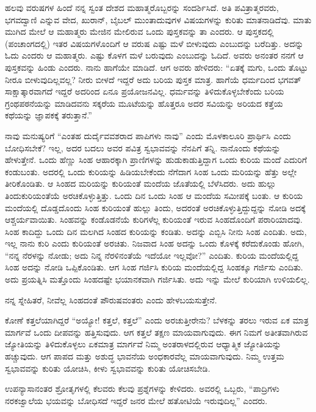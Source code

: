 ಹಲವು ವರುಷಗಳ ಹಿಂದೆ ನನ್ನ ಸ್ವಂತ ದೇಶದ ಮಹಾತ್ಮರೊಬ್ಬರನ್ನು ಸಂದರ್ಶಿಸಿದೆ. ಅತಿ ಪವಿತ್ರಾತ್ಮರವರು, ಭಗವದ್ವಾಣಿ ಎನ್ನುವ ವೇದ, ಖುರಾನ್, ಬೈಬಲ್ ಮುಂತಾದು\-ವುಗಳ ವಿಷಯಗಳನ್ನು ಕುರಿತು ಮಾತನಾಡಿದೆವು. ಮಾತು ಮುಗಿದ ಮೇಲೆ ಆ ಮಹಾತ್ಮರು ಮೇಜಿನ ಮೇಲಿರುವ ಒಂದು ಪುಸ್ತಕವನ್ನು ತಾ ಎಂದರು. ಆ ಪುಸ್ತಕದಲ್ಲಿ (ಪಂಚಾಂಗದಲ್ಲಿ) ಇತರ ವಿಷಯಗಳೊಂದಿಗೆ ಆ ವರುಷ ಎಷ್ಟು ಮಳೆ ಬೀಳುವುದು ಎಂಬುದನ್ನು ಬರೆದಿತ್ತು. ಅದನ್ನು ಓದು ಎಂದರು ಆ ಮಹಾತ್ಮರು. ಎಷ್ಟು ಕೊಳಗ ಮಳೆ ಬರುವುದು ಎಂಬುದನ್ನು ಓದಿದೆ. ಅವರು ಅನಂತರ ನನಗೆ ಆ ಪುಸ್ತಕವನ್ನು ಹಿಂಡು ಎಂದರು. ನಾನು ಹಾಗೆಯೇ ಮಾಡಿದೆ. ಆಗ ಅವರು ಹೇಳಿದರು: “ಏತಕ್ಕೆ ಮಗು, ಒಂದು ತೊಟ್ಟು ನೀರೂ ಬೀಳುವುದಿಲ್ಲವಲ್ಲ? ನೀರು ಬೀಳದೆ ಇದ್ದರೆ ಅದು ಬರಿಯ ಪುಸ್ತಕ ಮಾತ್ರ. ಹಾಗೆಯೆ ಧರ್ಮದಿಂದ ಭಗವತ್ ಸಾಕ್ಷಾತ್ಕಾರವಾಗದೆ ಇದ್ದರೆ ಅದರಿಂದ ಏನೂ ಪ್ರಯೋಜನವಿಲ್ಲ. ಧರ್ಮವನ್ನು ತಿಳಿದುಕೊಳ್ಳಬೇಕೆಂದು ಬರಿಯ ಗ್ರಂಥಪಠನೆಯನ್ನು ಮಾಡಿದವನು ಸಕ್ಕರೆಯ ಮೂಟೆಯನ್ನು ಹೊತ್ತರೂ ಅದರ ಸವಿಯನ್ನು ಅರಿಯದ ಕತ್ತೆಯ ಕಥೆಯನ್ನು ಜ್ಞಾಪಕಕ್ಕೆ ತರುತ್ತಾನೆ.”

ನಾವು ಮನುಷ್ಯರಿಗೆ “ಎಂತಹ ದುರ್ದೈವವಶರಾದ ಪಾಪಿಗಳು ನಾವು'' ಎಂದು ಮೊಳಕಾಲೂರಿ ಪ್ರಾರ್ಥಿಸಿ ಎಂದು ಬೋಧಿಸಬೇಕೆ? ಇಲ್ಲ, ಅದರ ಬದಲು ಅವರ ಪವಿತ್ರ ಸ್ವಭಾವವನ್ನು ನೆನಪಿಗೆ ತನ್ನಿ. ನಾನೊಂದು ಕಥೆಯನ್ನು ಹೇಳುತ್ತೇನೆ. ಒಂದು ಹೆಣ್ಣು ಸಿಂಹ ಆಹಾರಕ್ಕಾಗಿ ಪ್ರಾಣಿಗಳನ್ನು ಹುಡುಕಾಡುತ್ತಿದ್ದಾಗ ಒಂದು ಕುರಿಯ ಮಂದೆ ಎದುರಿಗೆ ಕಂಡುಬಂತು. ಅದರಲ್ಲಿ ಒಂದು ಕುರಿಯನ್ನು ಹಿಡಿಯಬೇಕೆಂದು ನೆಗೆದಾಗ ಸಿಂಹ ಒಂದು ಮರಿಯನ್ನು ಹೆತ್ತು ಅಲ್ಲೇ ತೀರಿಕೊಂಡಿತು. ಆ ಸಿಂಹದ ಮರಿಯನ್ನು ಕುರಿಯಂತೆ ಮಂದೆಯ ಜೊತೆಯಲ್ಲಿ ಬೆಳೆಸಿದರು. ಅದು ಹುಲ್ಲು ತಿಂದು\break ಕುರಿಯಂತೆಯೆ ಅರಚಿಕೊಳ್ಳುತ್ತಿತ್ತು. ಒಂದು ದಿನ ಒಂದು ಸಿಂಹ ಆ ಮಂದೆಯ ಸಮೀಪಕ್ಕೆ ಬಂತು. ಆ ಕುರಿಯ ಮಂದೆಯಲ್ಲಿ ದೊಡ್ಡದೊಂದು ಸಿಂಹ ಕುರಿಯಂತೆ ಹುಲ್ಲು ತಿಂದು, ಅದರಂತೆ ಅರಚಿಕೊಳ್ಳುತ್ತಿದ್ದುದ್ದನ್ನು ನೋಡಿ ಅದಕ್ಕೆ ಆಶ್ಚರ್ಯವಾಯಿತು. ಸಿಂಹವನ್ನು ಕಂಡೊಡನೆಯೆ ಕುರಿಗಳೆಲ್ಲ ಕುರಿಯಂತೆ ಇರುವ ಸಿಂಹದೊಂದಿಗೆ ಪರಾರಿಯಾದವು. ಸಿಂಹ ಕಾದಿದ್ದು ಒಂದು ದಿನ ಮಲಗಿದ ಸಿಂಹದ ಕುರಿಯನ್ನು ಕಂಡಿತು. ಅದನ್ನು ಎಬ್ಬಿಸಿ ನೀನು ಸಿಂಹ ಎಂದಿತು. ಅದು, ಇಲ್ಲ ನಾನು ಕುರಿ ಎಂದು ಕುರಿಯಂತೆ ಅರಚಿತು. ನಿಜವಾದ ಸಿಂಹ ಅದನ್ನು ಒಂದು ಕೊಳಕ್ಕೆ ಕರೆದುಕೊಂಡು ಹೋಗಿ, “ನನ್ನ ನೆರಳನ್ನು ನೋಡು; ಅದು ನಿನ್ನ ನೆರಳಿನಂತೆಯೆ ಇದೆಯೋ ಇಲ್ಲವೋ?'' ಎಂದಿತು. ಕುರಿಯ ಮಂದೆಯಲ್ಲಿದ್ದ ಸಿಂಹ ಅದನ್ನು ನೋಡಿ ಒಪ್ಪಿಕೊಂಡಿತು. ಆಗ ಸಿಂಹ ಗರ್ಜಿಸಿ ಕುರಿಯ ಮಂದೆಯಲ್ಲಿದ್ದ ಸಿಂಹಕ್ಕೂ ಗರ್ಜಿಸು ಎಂದಿತು. ಅದು ಪ್ರಯತ್ನಿಸಿ ಮತ್ತೊಂದು ಸಿಂಹದಷ್ಟೇ ಭಯಾನಕವಾಗಿ ಗರ್ಜಿಸಿತು. ಅದು ಇನ್ನು ಮೇಲೆ ಕುರಿಯಾಗಿ ಉಳಿಯಲಿಲ್ಲ.

ನನ್ನ ಸ್ನೇಹಿತರೆ, ನೀವೆಲ್ಲ ಸಿಂಹದಂತೆ ಪೌರುಷವಂತರು ಎಂದು ಹೇಳಬಯಸುತ್ತೇನೆ.

ಕೋಣೆ ಕತ್ತಲೆಯಾಗಿದ್ದರೆ “ಅಯ್ಯೋ! ಕತ್ತಲೆ, ಕತ್ತಲೆ'' ಎಂದು ಅರಚುತ್ತೀರೇನು? ಬೆಳಕನ್ನು ತರಲು ಇರುವ ಏಕ ಮಾತ್ರ ಮಾರ್ಗವೆ ಒಂದು ದೀಪವನ್ನು ಹತ್ತಿಸುವುದು. ಆಗ ಕತ್ತಲೆ ತಕ್ಷಣ ಮಾಯವಾಗುವುದು. ಈಗ ನಿಮಗೆ ಅತೀತವಾಗಿರುವ ಜ್ಯೋತಿಯನ್ನು ತಿಳಿದುಕೊಳ್ಳಲು ಏಕಮಾತ್ರ ಮಾರ್ಗವೆ ನಿಮ್ಮ ಅಂತರಾಳದಲ್ಲಿರುವ ಆಧ್ಯಾತ್ಮಿಕ ಜ್ಯೋತಿಯನ್ನು ಹಚ್ಚುವುದು. ಆಗ ಪಾಪದ ಮತ್ತು ಅಶುದ್ಧ ಭಾವನೆಯ ಅಂಧಕಾರವೆಲ್ಲ ಮಾಯವಾಗುವುದು. ನಿಮ್ಮ ಉತ್ತಮ ಸ್ವಭಾವವನ್ನು ಕುರಿತು ಯೋಚಿಸಿ, ಕೀಳು ಸ್ವಭಾವವನ್ನು ಕುರಿತು ಯೋಚಿಸಬೇಡಿ.

\delimiter

ಉಪನ್ಯಾಸಾನಂತರ ಶ್ರೋತೃಗಳಲ್ಲಿ ಕೆಲವರು ಕೆಲವು ಪ್ರಶ್ನೆಗಳನ್ನು ಕೇಳಿದರು. ಅವರಲ್ಲಿ ಒಬ್ಬರು, “ಪಾದ್ರಿಗಳು ನರಕಜ್ವಾಲೆಯ ಭಯವನ್ನು ಬೋಧಿಸದೆ ಇದ್ದರೆ ಜನರ ಮೇಲೆ ಹತೋಟಿಯೆ ಇರುವುದಿಲ್ಲ” ಎಂದರು.

